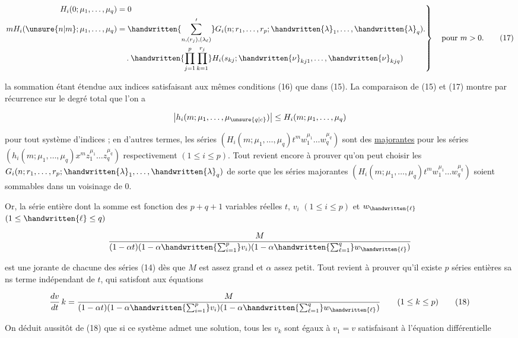 
\[
\left.\begin{aligned}
H_i(0;\mu_1,\ldots,\mu_q)&=0\\
mH_i(\unsure{n|m};\mu_1,\ldots,\mu_q)&=\handwritten{\sum'_{n,(r_j),(\lambda_\ell)}}G_i(n;r_1,\ldots,r_p;\handwritten{\lambda}_1,\ldots,\handwritten{\lambda}_q)\mathbin{.}\\
&\quad\mathbin{.}\handwritten{\prod_{j=1}^{p}\prod_{k=1}^{r_j}}H_i(s_{kj};\handwritten{\nu}_{kj1},\ldots,\handwritten{\nu}_{kjq})
\end{aligned}\right\}
\quad\text{pour }m>0.\tag*{(17)}
\]

la sommation étant étendue aux indices satisfaisant aux mêmes conditions (16) que dans (15). La comparaison de (15) et (17) montre par récurrence sur le degré total que l'on a

\[
\left|h_i(m;\mu_1,\ldots,\mu_{\unsure{q|c}})\right|\leq H_i(m;\mu_1,\ldots,\mu_q)
\]

pour tout système d'indices ; en d'autres termes, les séries $(H_i(m;\mu_1,\ldots,\mu_q)t^mw_1^{\mu_1}\ldots w_q^{\mu_q})$ sont des \uline{majorantes} pour les séries $(h_i(m;\mu_1,\ldots,\mu_q)x^mz_1^{\mu_1}\ldots z_q^{\mu_q})$ respectivement $(1\leq i\leq p)$. Tout revient encore à prouver qu'on peut choisir les $G_i(n;r_1,\ldots,r_p;\handwritten{\lambda}_1,\ldots,\handwritten{\lambda}_q)$ de sorte que les séries majorantes $(H_i(m;\mu_1,\ldots,\mu_q)t^mw_1^{\mu_1}\ldots w_q^{\mu_q})$ soient sommables dans un voisinage de $0$.

Or, la série entière dont la somme est fonction des $p+q+1$ variables réelles $t$, $v_i$ $(1\leq i\leq p)$ et $w_{\handwritten{\ell}}$ $(1\leq\handwritten{\ell}\leq q)$

\[
\frac{M}{(1-\alpha t)(1-\alpha\handwritten{\sum_{i=1}^{p}}v_i)(1-\alpha\handwritten{\sum_{\ell=1}^{q}}w_{\handwritten{\ell}})}
\]

est une jorante de chacune des séries (14) dès que $M$ est assez grand et $\alpha$ assez petit. Tout revient à prouver qu'il existe $p$ séries entières sa ns terme indépendant de $t$, qui satisfont aux équations

\[
\frac{dv}{dt}\,k=\frac{M}{(1-\alpha t)(1-\alpha\handwritten{\sum_{i=1}^{p}}v_i)(1-\alpha\handwritten{\sum_{\ell=1}^{q}}w_{\handwritten{\ell}})}
\qquad(1\leq k\leq p)\tag*{(18)}
\]

On déduit aussitôt de (18) que si ce système admet une solution, tous les $v_k$ sont égaux à $v_1=v$ satisfaisant à l'équation différentielle

